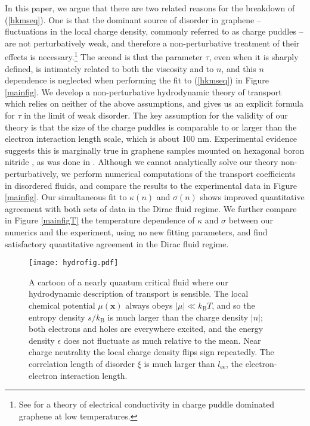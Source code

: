 \documentclass[10pt, oneside]{book}
\begin{document}
\begin{doublespace}
In this paper, we argue that there are two related reasons for the breakdown of (\ref{hkmseq}).  One is that the dominant source of disorder in graphene -- fluctuations in the local charge density, commonly referred to as charge puddles \cite{yacoby2007, sarmachargepuddles, crommie, xue} --  are not perturbatively weak, and therefore a non-perturbative treatment of their effects is necessary.\footnote{See \cite{sarma1, sarma2} for a theory of electrical conductivity in charge puddle dominated graphene at low temperatures.}   The second is that the parameter $\tau$, even when it is sharply defined, is intimately related to both the viscosity and to $n$, and this $n$ dependence is neglected when performing the  fit to (\ref{hkmseq}) in Figure \ref{mainfig}.    We develop a non-perturbative hydrodynamic theory of transport which relies on neither of the above assumptions, and gives us an explicit formula for $\tau$ in the limit of weak disorder.   The key assumption for the validity of our theory is that the size of the charge puddles is comparable to or larger than the electron interaction length scale, which is about 100 nm.   Experimental evidence suggests this is  marginally true in graphene samples mounted on hexagonal boron nitride \cite{xue}, as was done in \cite{Crossno1058}.   Although we cannot analytically solve our theory non-perturbatively, we perform numerical computations of the transport coefficients in disordered fluids, and compare the results to the experimental data in Figure \ref{mainfig}.  Our simultaneous fit to $\kappa(n)$ and $\sigma(n)$ shows improved quantitative agreement with both sets of data in the Dirac fluid regime.    We further compare in Figure \ref{mainfigT} the temperature dependence of $\kappa$ and $\sigma$ between our numerics and the experiment, using no new fitting parameters, and find satisfactory quantitative agreement in the Dirac fluid regime.  

\begin{figure}[t]
\centering
\texttt{[image: hydrofig.pdf]}
\caption{A cartoon of a nearly quantum critical fluid where our hydrodynamic description of transport is sensible.   The local chemical potential $\mu(\mathbf{x})$ always obeys $|\mu| \ll k_{\mathrm{B}}T$,  and so the entropy density $s/k_{\mathrm{B}}$ is much larger than the charge density $|n|$;  both electrons and holes are everywhere excited, and the energy density $\epsilon$ does not fluctuate as much relative to the mean.  Near charge neutrality the local charge density flips sign repeatedly.   The correlation length of disorder $\xi$ is much larger than $l_{\mathrm{ee}}$, the electron-electron interaction length.}
\label{hydrofig}
\end{figure}


\end{doublespace}
\end{document}
